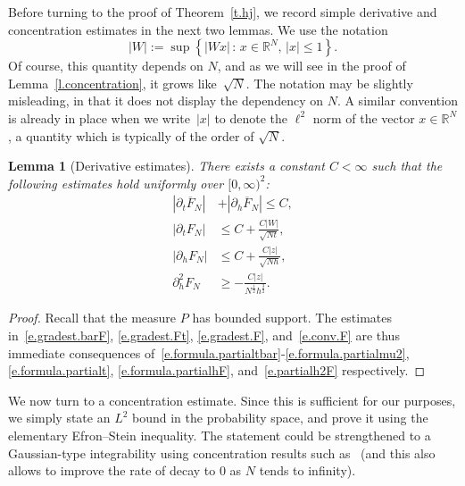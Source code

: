 \documentclass[10pt]{amsart}
\newtheorem{lemm}[theo]{Lemma}\newtheorem{prop}[theo]{Proposition}\newtheorem{coro}[theo]{Corollary}\newtheorem{conj}[theo]{Conjecture}
\theoremstyle{definition}\newtheorem{defi}[theo]{Definition}\newtheorem{rema}[theo]{Remark}\newtheorem{exam}[theo]{Example}\newtheorem{exem}[theo]{Example}\newtheorem{nota}[theo]{Notation}
\newcommand{\R}{\mathbb{R}}
\newcommand{\1}{\mathds{1}}
\renewcommand{\le}{\leqslant}
\renewcommand{\ge}{\geqslant}
\renewcommand{\bar}{\overline}
\begin{document}
Before turning to the proof of Theorem~\ref{t.hj}, we record simple derivative and concentration estimates in the next two lemmas. We use the notation
\[
|W| := \sup \left\{|W x| \, : \, x \in \R^N, \, |x|\le 1\right\}.
\]
Of course, this quantity depends on $N$, and as we will see in the proof of Lemma~\ref{l.concentration}, it grows like~$\sqrt{N}$. The notation may be slightly misleading, in that it does not display the dependency on $N$. A similar convention is already in place when we write~$|x|$ to denote the $\ell^2$ norm of the vector $x \in \R^N$, a quantity which is typically of the order of $\sqrt{N}$.

\begin{lemm}[Derivative estimates]\label{l.gradient}
There exists a constant $C < \infty$ such that the following estimates hold uniformly over $[0,\infty)^2$:
\begin{align}
\left|\partial_t \bar F_N\right| &+ \left|\partial_h \bar F_N\right|
\le C,\label{e.gradest.barF}
\\
\left|\partial_t F_N\right| &\le C + \frac{C|W|}{\sqrt{Nt}},\label{e.gradest.Ft}
\\
\left|\partial_h F_N\right| &\le C + \frac{C|z|}{\sqrt{Nh}},\label{e.gradest.F}
\\
\partial_h^2 F_N &\ge - \frac{C|z|}{N^\frac 1 2 h^\frac 3 2}.\label{e.conv.F}
\end{align}
\end{lemm}


\begin{proof}
Recall that the measure $P$ has bounded support. The estimates in~\eqref{e.gradest.barF}, \eqref{e.gradest.Ft}, \eqref{e.gradest.F}, and~\eqref{e.conv.F} are thus immediate consequences of~\eqref{e.formula.partialtbar}-\eqref{e.formula.partialmu2}, \eqref{e.formula.partialt}, \eqref{e.formula.partialhF}, and~\eqref{e.partialh2F} respectively.
\end{proof}


We now turn to a concentration estimate. Since this is sufficient for our purposes, we simply state an $L^2$ bound in the probability space, and prove it using the elementary Efron--Stein inequality. The statement could be strengthened to a Gaussian-type integrability using concentration results such as~\cite[Theorems~5.5 and~6.2]{blm} (and this also allows to improve the rate of decay to $0$ as $N$ tends to infinity).
\end{document}
